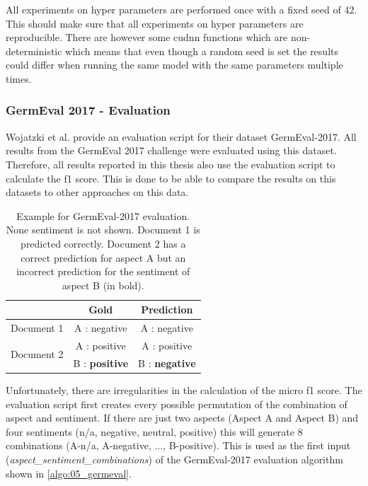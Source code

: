 All experiments on hyper parameters are performed once with a fixed seed of 42. This should make sure that all experiments on hyper parameters are reproducible. There are however some cudnn functions which are non-deterministic which means that even though a random seed is set the results could differ when running the same model with the same parameters multiple times.

\subsubsection*{GermEval 2017 - Evaluation}

Wojatzki et al. \cite{Wojatzki} provide an evaluation script for their dataset GermEval-2017. All results from the GermEval 2017 challenge were evaluated using this dataset. Therefore, all results reported in this thesis also use the evaluation script to calculate the f1 score. This is done to be able to compare the results on this datasets to other approaches on this data.

\begin{table}[hbt]
	\centering
	\label{tab:05_germevalEvaluationExample}
	\caption{Example for GermEval-2017 evaluation. None sentiment is not shown. Document 1 is predicted correctly. Document 2 has a correct prediction for aspect A but an incorrect prediction for the sentiment of aspect B {(in bold)}.}
	\begin{tabular}{@{}lcc}
		\toprule 
		& \textbf{Gold} & \textbf{Prediction} \\ 
		\hline 
		Document 1 & A : negative & A : negative \\ 
		\hline 
		\multirow{2}{*}{Document 2} & A : positive & A : positive \\ 
		& B : \textbf{positive} & B : \textbf{negative} \\ 
		\hline 
	\end{tabular}
\end{table}

Unfortunately, there are irregularities in the calculation of the micro f1 score. The evaluation script first creates every possible permutation of the combination of aspect and sentiment. If there are just two aspects {(Aspect A and Aspect B)} and four sentiments {(n/a, negative, neutral, positive)} this will generate 8 combinations {(A-n/a, A-negative, ..., B-positive)}. This is used as the first input {(\textit{aspect\_sentiment\_combinations})} of the GermEval-2017 evaluation algorithm shown in \ref{algo:05_germeval}.

